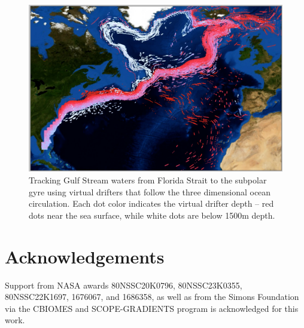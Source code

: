 \documentclass{juliacon}[12pt]
\begin{document}
\begin{figure}[hb] 
\includegraphics[width=\columnwidth]{figs/GulfStream_21_27_snapshot.png}
\caption{Tracking Gulf Stream waters from Florida Strait to the subpolar gyre using virtual drifters that follow the three dimensional ocean circulation. Each dot color indicates the virtual drifter depth -- red dots near the sea surface, while white dots are below 1500m depth.}
\label{fig:Cstream}
\end{figure} 

\section{Acknowledgements}

Support from NASA awards 80NSSC20K0796, 80NSSC23K0355, 80NSSC22K1697, 1676067, and 1686358, as well as from the Simons Foundation via the CBIOMES and SCOPE-GRADIENTS program is acknowledged for this work.


\end{document}
